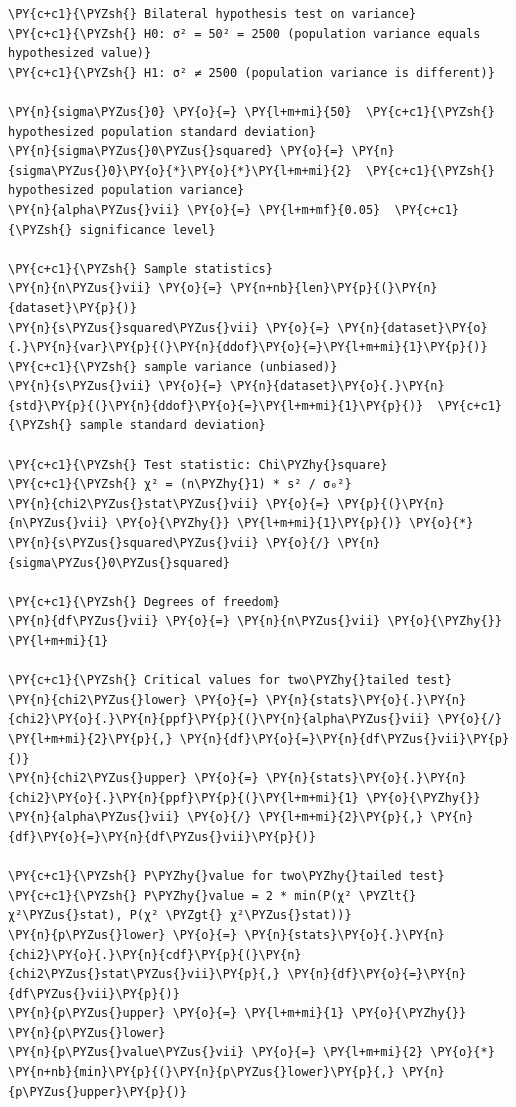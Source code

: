     \begin{tcolorbox}[breakable, size=fbox, boxrule=1pt, pad at break*=1mm,colback=cellbackground, colframe=cellborder]
\begin{Verbatim}[commandchars=\\\{\}]
\PY{c+c1}{\PYZsh{} Bilateral hypothesis test on variance}
\PY{c+c1}{\PYZsh{} H0: σ² = 50² = 2500 (population variance equals hypothesized value)}
\PY{c+c1}{\PYZsh{} H1: σ² ≠ 2500 (population variance is different)}

\PY{n}{sigma\PYZus{}0} \PY{o}{=} \PY{l+m+mi}{50}  \PY{c+c1}{\PYZsh{} hypothesized population standard deviation}
\PY{n}{sigma\PYZus{}0\PYZus{}squared} \PY{o}{=} \PY{n}{sigma\PYZus{}0}\PY{o}{*}\PY{o}{*}\PY{l+m+mi}{2}  \PY{c+c1}{\PYZsh{} hypothesized population variance}
\PY{n}{alpha\PYZus{}vii} \PY{o}{=} \PY{l+m+mf}{0.05}  \PY{c+c1}{\PYZsh{} significance level}

\PY{c+c1}{\PYZsh{} Sample statistics}
\PY{n}{n\PYZus{}vii} \PY{o}{=} \PY{n+nb}{len}\PY{p}{(}\PY{n}{dataset}\PY{p}{)}
\PY{n}{s\PYZus{}squared\PYZus{}vii} \PY{o}{=} \PY{n}{dataset}\PY{o}{.}\PY{n}{var}\PY{p}{(}\PY{n}{ddof}\PY{o}{=}\PY{l+m+mi}{1}\PY{p}{)}  \PY{c+c1}{\PYZsh{} sample variance (unbiased)}
\PY{n}{s\PYZus{}vii} \PY{o}{=} \PY{n}{dataset}\PY{o}{.}\PY{n}{std}\PY{p}{(}\PY{n}{ddof}\PY{o}{=}\PY{l+m+mi}{1}\PY{p}{)}  \PY{c+c1}{\PYZsh{} sample standard deviation}

\PY{c+c1}{\PYZsh{} Test statistic: Chi\PYZhy{}square}
\PY{c+c1}{\PYZsh{} χ² = (n\PYZhy{}1) * s² / σ₀²}
\PY{n}{chi2\PYZus{}stat\PYZus{}vii} \PY{o}{=} \PY{p}{(}\PY{n}{n\PYZus{}vii} \PY{o}{\PYZhy{}} \PY{l+m+mi}{1}\PY{p}{)} \PY{o}{*} \PY{n}{s\PYZus{}squared\PYZus{}vii} \PY{o}{/} \PY{n}{sigma\PYZus{}0\PYZus{}squared}

\PY{c+c1}{\PYZsh{} Degrees of freedom}
\PY{n}{df\PYZus{}vii} \PY{o}{=} \PY{n}{n\PYZus{}vii} \PY{o}{\PYZhy{}} \PY{l+m+mi}{1}

\PY{c+c1}{\PYZsh{} Critical values for two\PYZhy{}tailed test}
\PY{n}{chi2\PYZus{}lower} \PY{o}{=} \PY{n}{stats}\PY{o}{.}\PY{n}{chi2}\PY{o}{.}\PY{n}{ppf}\PY{p}{(}\PY{n}{alpha\PYZus{}vii} \PY{o}{/} \PY{l+m+mi}{2}\PY{p}{,} \PY{n}{df}\PY{o}{=}\PY{n}{df\PYZus{}vii}\PY{p}{)}
\PY{n}{chi2\PYZus{}upper} \PY{o}{=} \PY{n}{stats}\PY{o}{.}\PY{n}{chi2}\PY{o}{.}\PY{n}{ppf}\PY{p}{(}\PY{l+m+mi}{1} \PY{o}{\PYZhy{}} \PY{n}{alpha\PYZus{}vii} \PY{o}{/} \PY{l+m+mi}{2}\PY{p}{,} \PY{n}{df}\PY{o}{=}\PY{n}{df\PYZus{}vii}\PY{p}{)}

\PY{c+c1}{\PYZsh{} P\PYZhy{}value for two\PYZhy{}tailed test}
\PY{c+c1}{\PYZsh{} P\PYZhy{}value = 2 * min(P(χ² \PYZlt{} χ²\PYZus{}stat), P(χ² \PYZgt{} χ²\PYZus{}stat))}
\PY{n}{p\PYZus{}lower} \PY{o}{=} \PY{n}{stats}\PY{o}{.}\PY{n}{chi2}\PY{o}{.}\PY{n}{cdf}\PY{p}{(}\PY{n}{chi2\PYZus{}stat\PYZus{}vii}\PY{p}{,} \PY{n}{df}\PY{o}{=}\PY{n}{df\PYZus{}vii}\PY{p}{)}
\PY{n}{p\PYZus{}upper} \PY{o}{=} \PY{l+m+mi}{1} \PY{o}{\PYZhy{}} \PY{n}{p\PYZus{}lower}
\PY{n}{p\PYZus{}value\PYZus{}vii} \PY{o}{=} \PY{l+m+mi}{2} \PY{o}{*} \PY{n+nb}{min}\PY{p}{(}\PY{n}{p\PYZus{}lower}\PY{p}{,} \PY{n}{p\PYZus{}upper}\PY{p}{)}


\end{Verbatim}
\end{tcolorbox}
